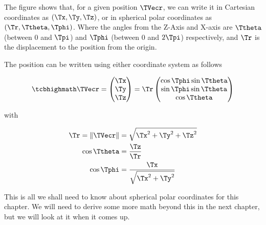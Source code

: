 The figure shows that, for a given position $\TVecr $, we can write it in Cartesian coordinates as $({\Tx },{\Ty },{\Tz })$, or in spherical polar coordinates as $(\Tr ,\Ttheta ,\Tphi )$.
Where the angles from the Z-Axis and X-axis are $\Ttheta $ (between 0 and $\Tpi $) and $\Tphi $ (between 0 and $2\Tpi $) respectively, and ${\Tr }$ is the displacement to the position from the origin.

The position can be written using either coordinate system as follows

\begin{equation}
	\label{eq: cartesian to spherical polar coordinates}
	\mhl{
		\TVecr  =
		\begin{pmatrix}
			\Tx  \\
			\Ty  \\
			\Tz  \\
		\end{pmatrix}
		= \Tr
		\begin{pmatrix}
			\cos{\Tphi }\sin{\Ttheta } \\
			\sin{\Tphi }\sin{\Ttheta } \\
			\cos{\Ttheta }           \\
		\end{pmatrix}
	}
\end{equation}

with

\begin{equation}
	\begin{aligned}
		\Tr  = \|\TVecr \| & =\sqrt{\Tx ^2 + \Ty ^2 + \Tz ^2}      \\
		\cos\Ttheta             & = \frac{\Tz }{\Tr }                \\
		\cos\Tphi               & = \frac{\Tx }{\sqrt{\Tx ^2 + \Ty ^2} }
	\end{aligned}
\end{equation}

This is all we shall need to know about spherical polar coordinates for this chapter.
We will need to derive some more math beyond this in the next chapter, but we will look at it when it comes up.


